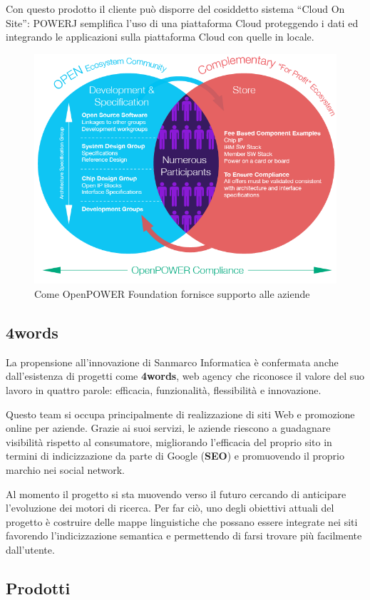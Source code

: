 Con questo prodotto il cliente può disporre del cosiddetto sistema ``Cloud On
Site'': POWERJ semplifica l'uso di una piattaforma Cloud proteggendo i dati ed
integrando le applicazioni sulla piattaforma Cloud con quelle in locale.

\begin{figure}%
\centering
\includegraphics[width=.7\columnwidth]{immagini/open-power-foundation}%
\caption{Come OpenPOWER Foundation fornisce supporto alle aziende}%
\label{fig:open-power-foundation}%
\end{figure}

\subsection{4words} \mbox{}

La propensione all'innovazione di Sanmarco Informatica è confermata anche
dall'esistenza di progetti come \textbf{4words}, web agency che riconosce il
valore del suo lavoro in quattro parole: efficacia, funzionalità, flessibilità
e innovazione.

Questo team si occupa principalmente di realizzazione di siti Web e promozione
online per aziende. Grazie ai suoi servizi, le aziende riescono a guadagnare
visibilità rispetto al consumatore, migliorando l'efficacia del proprio sito in
termini di indicizzazione da parte di Google (\textbf{SEO}) e promuovendo il
proprio marchio nei social network.

Al momento il progetto si sta muovendo verso il futuro cercando di anticipare
l'evoluzione dei motori di ricerca. Per far ciò, uno degli obiettivi attuali
del progetto è costruire delle mappe linguistiche che possano essere integrate
nei siti favorendo l'indicizzazione semantica e permettendo di farsi trovare
più facilmente dall'utente.

\subsection{Prodotti} \mbox{}

